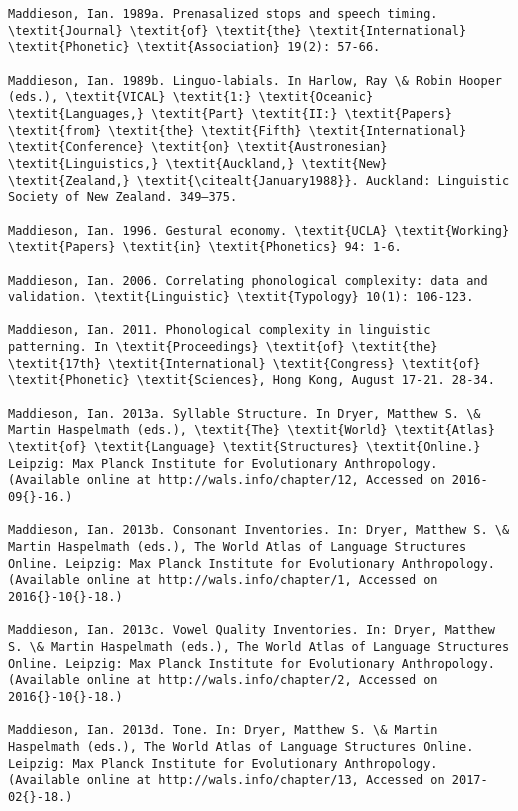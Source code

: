 \begin{verbatim}
Maddieson, Ian. 1989a. Prenasalized stops and speech timing. \textit{Journal} \textit{of} \textit{the} \textit{International} \textit{Phonetic} \textit{Association} 19(2): 57-66.

Maddieson, Ian. 1989b. Linguo-labials. In Harlow, Ray \& Robin Hooper (eds.), \textit{VICAL} \textit{1:} \textit{Oceanic} \textit{Languages,} \textit{Part} \textit{II:} \textit{Papers} \textit{from} \textit{the} \textit{Fifth} \textit{International} \textit{Conference} \textit{on} \textit{Austronesian} \textit{Linguistics,} \textit{Auckland,} \textit{New} \textit{Zealand,} \textit{\citealt{January1988}}. Auckland: Linguistic Society of New Zealand. 349–375.

Maddieson, Ian. 1996. Gestural economy. \textit{UCLA} \textit{Working} \textit{Papers} \textit{in} \textit{Phonetics} 94: 1-6.

Maddieson, Ian. 2006. Correlating phonological complexity: data and validation. \textit{Linguistic} \textit{Typology} 10(1): 106-123.

Maddieson, Ian. 2011. Phonological complexity in linguistic patterning. In \textit{Proceedings} \textit{of} \textit{the} \textit{17th} \textit{International} \textit{Congress} \textit{of} \textit{Phonetic} \textit{Sciences}, Hong Kong, August 17-21. 28-34.

Maddieson, Ian. 2013a. Syllable Structure. In Dryer, Matthew S. \& Martin Haspelmath (eds.), \textit{The} \textit{World} \textit{Atlas} \textit{of} \textit{Language} \textit{Structures} \textit{Online.} Leipzig: Max Planck Institute for Evolutionary Anthropology. (Available online at http://wals.info/chapter/12, Accessed on 2016-09{}-16.)

Maddieson, Ian. 2013b. Consonant Inventories. In: Dryer, Matthew S. \& Martin Haspelmath (eds.), The World Atlas of Language Structures Online. Leipzig: Max Planck Institute for Evolutionary Anthropology. (Available online at http://wals.info/chapter/1, Accessed on 2016{}-10{}-18.) 

Maddieson, Ian. 2013c. Vowel Quality Inventories. In: Dryer, Matthew S. \& Martin Haspelmath (eds.), The World Atlas of Language Structures Online. Leipzig: Max Planck Institute for Evolutionary Anthropology. (Available online at http://wals.info/chapter/2, Accessed on 2016{}-10{}-18.)

Maddieson, Ian. 2013d. Tone. In: Dryer, Matthew S. \& Martin Haspelmath (eds.), The World Atlas of Language Structures Online. Leipzig: Max Planck Institute for Evolutionary Anthropology. (Available online at http://wals.info/chapter/13, Accessed on 2017-02{}-18.)


\end{verbatim}
